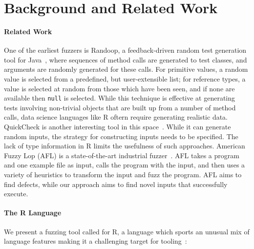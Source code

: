 \documentclass[sigplan,screen]{acmart}
\begin{document}
\section{Background and Related Work}
\label{sec:background}

\paragraph{Related Work}
One of the earliest fuzzers is Randoop,
a feedback-driven random test generation tool for
Java~\cite{pacheco2007randoop}, where sequences of method
calls are generated to test classes, and arguments are randomly
generated for these calls. For primitive values, a random value is
selected from a predefined, but user-extensible list; for reference
types, a value is selected at random from those which have been seen,
and if none are available then {\tt null} is selected.  While this
technique is effective at generating tests involving non-trivial
objects that are built up from a number of method calls, data science
languages like R oftern require generating realistic data.  QuickCheck
is another interesting tool in this space~\cite{quickcheck}.  While it
can generate random inputs, the strategy for constructing inputs needs
to be specified.  The lack of type information in R limits the
usefulness of such approaches. American Fuzzy Lop (AFL) is a
state-of-the-art industrial fuzzer~\cite{afl}. AFL takes a program and
one example file as input, calls the program with the input, and then
uses a variety of heuristics to transform the input and fuzz the
program.  AFL aims to find defects, while our approach
aims to find novel inputs that successfully execute.

\paragraph{The R Language}

We present a fuzzing tool called \tool for R, a language which sports an unusual mix of
language features making it a challenging target for
tooling~\cite{morandat2012evaluating}:
\end{document}
